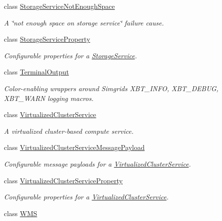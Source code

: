 \begin{DoxyCompactItemize}
class \hyperlink{classwrench_1_1_storage_service_not_enough_space}{Storage\+Service\+Not\+Enough\+Space}
\begin{DoxyCompactList}\small\item\em A \char`\"{}not enough space on storage service\char`\"{} failure cause. \end{DoxyCompactList}\item 
class \hyperlink{classwrench_1_1_storage_service_property}{Storage\+Service\+Property}
\begin{DoxyCompactList}\small\item\em Configurable properties for a \hyperlink{classwrench_1_1_storage_service}{Storage\+Service}. \end{DoxyCompactList}\item 
class \hyperlink{classwrench_1_1_terminal_output}{Terminal\+Output}
\begin{DoxyCompactList}\small\item\em Color-\/enabling wrappers around Simgrid\textquotesingle{}s X\+B\+T\+\_\+\+I\+N\+FO, X\+B\+T\+\_\+\+D\+E\+B\+UG, X\+B\+T\+\_\+\+W\+A\+RN logging macros. \end{DoxyCompactList}\item 
class \hyperlink{classwrench_1_1_virtualized_cluster_service}{Virtualized\+Cluster\+Service}
\begin{DoxyCompactList}\small\item\em A virtualized cluster-\/based compute service. \end{DoxyCompactList}\item 
class \hyperlink{classwrench_1_1_virtualized_cluster_service_message_payload}{Virtualized\+Cluster\+Service\+Message\+Payload}
\begin{DoxyCompactList}\small\item\em Configurable message payloads for a \hyperlink{classwrench_1_1_virtualized_cluster_service}{Virtualized\+Cluster\+Service}. \end{DoxyCompactList}\item 
class \hyperlink{classwrench_1_1_virtualized_cluster_service_property}{Virtualized\+Cluster\+Service\+Property}
\begin{DoxyCompactList}\small\item\em Configurable properties for a \hyperlink{classwrench_1_1_virtualized_cluster_service}{Virtualized\+Cluster\+Service}. \end{DoxyCompactList}\item 
class \hyperlink{classwrench_1_1_w_m_s}{W\+MS}

\end{DoxyCompactItemize}
